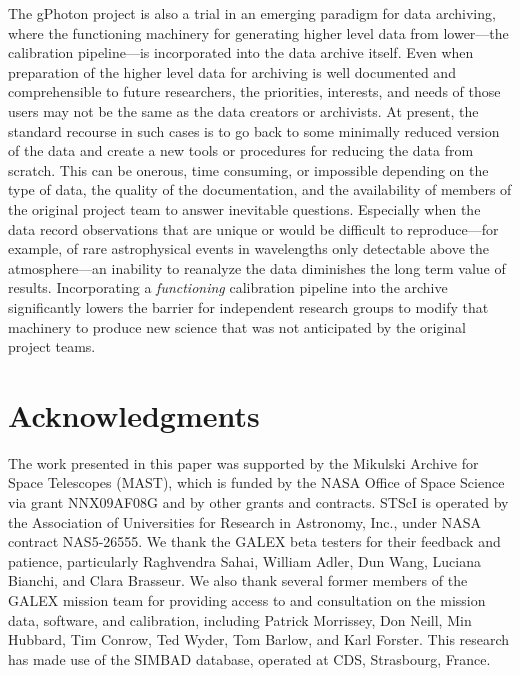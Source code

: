 \documentclass[preprint]{aastex}
\begin{document}
The gPhoton project is also a trial in an emerging paradigm for data archiving, where the functioning machinery for generating higher level data from lower---the calibration pipeline---is incorporated into the data archive itself. Even when preparation of the higher level data for archiving is well documented and comprehensible to future researchers, the priorities, interests, and needs of those users may not be the same as the data creators or archivists. At present, the standard recourse in such cases is to go back to some minimally reduced version of the data and create a new tools or procedures for reducing the data from scratch. This can be onerous, time consuming, or impossible depending on the type of data, the quality of the documentation, and the availability of members of the original project team to answer inevitable questions. Especially when the data record observations that are unique or would be difficult to reproduce---for example, of rare astrophysical events in wavelengths only detectable above the atmosphere---an inability to reanalyze the data diminishes the long term value of results. Incorporating a \emph{functioning} calibration pipeline into the archive significantly lowers the barrier for independent research groups to modify that machinery to produce new science that was not anticipated by the original project teams.

\section{Acknowledgments}
The work presented in this paper was supported by the Mikulski Archive for Space Telescopes (MAST), which is funded by the NASA Office of Space Science via grant NNX09AF08G and by other grants and contracts. STScI is operated by the Association of Universities for Research in Astronomy, Inc., under NASA contract NAS5-26555.  We thank the GALEX beta testers for their feedback and patience, particularly Raghvendra Sahai, William Adler, Dun Wang, Luciana Bianchi, and Clara Brasseur.  We also thank several former members of the GALEX mission team for providing access to and consultation on the mission data, software, and calibration, including Patrick Morrissey, Don Neill, Min Hubbard, Tim Conrow, Ted Wyder, Tom Barlow, and Karl Forster.  This research has made use of the SIMBAD database, operated at CDS, Strasbourg, France.



\clearpage
\end{document}
